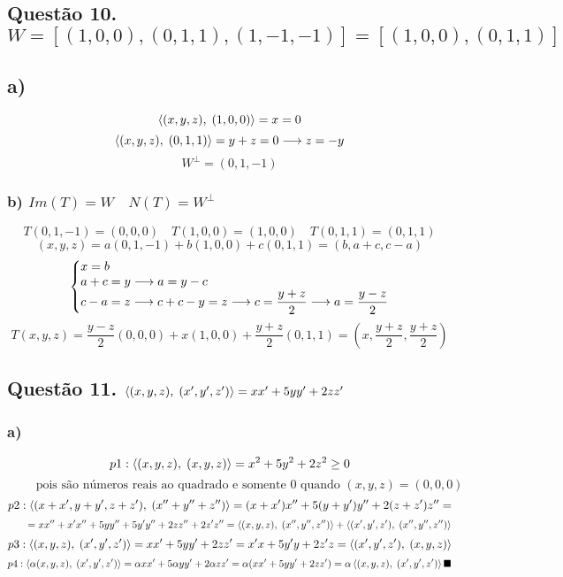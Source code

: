 \documentclass[12pt]{article}
\begin{document}
\subsection{Questão 10. $W = [(1,0,0),(0,1,1),(1,-1,-1)] = [(1,0,0),(0,1,1)]$}
\subsection{a)}

\[\left\langle(x,y,z),\;(1,0,0)\right\rangle = x = 0\]
\[\left\langle(x,y,z),\;(0,1,1)\right\rangle = y+z = 0 \longrightarrow z = -y\]
\[W^{\perp} = (0,1,-1)\]

\subsubsection{b) $Im(T)=W \quad N(T) = W^{\perp}$}

\[T(0,1,-1) = (0,0,0) \quad T(1,0,0) = (1,0,0) \quad T(0,1,1) = (0,1,1)\]
\[(x,y,z) = a(0,1,-1)+b(1,0,0)+c(0,1,1) = (b,a+c,c-a)\]
\[\left \{ \begin{array}{@{}l@{}} x=b \\ a+c=y \longrightarrow a=y-c \\ c-a=z \longrightarrow c+c-y=z \longrightarrow c = \dfrac{y+z}{2} \longrightarrow a = \dfrac{y-z}{2} \end{array} \right.\]
\[T(x,y,z) = \dfrac{y-z}{2}(0,0,0) + x(1,0,0) + \dfrac{y+z}{2}(0,1,1) = \left( x, \dfrac{y+z}{2}, \dfrac{y+z}{2} \right)\]

\subsection{Questão 11. $\left\langle(x,y,z),\;(x',y',z')\right\rangle = xx'+5yy'+2zz'$}
\subsubsection{a)}

\[p1: \left\langle(x,y,z),\;(x,y,z)\right\rangle = x^{2}+5y^{2}+2z^{2} \geq 0\]
\[\qquad \text{ pois são números reais ao quadrado e somente } 0 \text{ quando } (x,y,z) = (0,0,0)\]
\[p2: \left\langle(x+x',y+y',z+z'),\;(x''+y''+z'')\right\rangle = (x+x')x'' + 5(y+y')y'' + 2(z+z')z'' =\]
\[\qquad = xx''+x'x'' + 5yy''+5y'y'' + 2zz''+2z'z'' = \left\langle(x,y,z),\;(x'',y'',z'')\right\rangle + \left\langle(x',y',z'),\;(x'',y'',z'')\right\rangle\]
\[p3: \left\langle(x,y,z),\;(x',y',z')\right\rangle = xx'+5yy'+2zz' = x'x+5y'y+2z'z = \left\langle(x',y',z'),\;(x,y,z)\right\rangle\]
\[p4: \p{\alpha(x,y,z)}{(x',y',z')} = \alpha xx'+5\alpha yy'+2\alpha zz' = \alpha(xx'+5yy'+2zz') = \alpha \p{(x,y,z)}{(x',y',z')} \hfill \blacksquare\]
\end{document}
